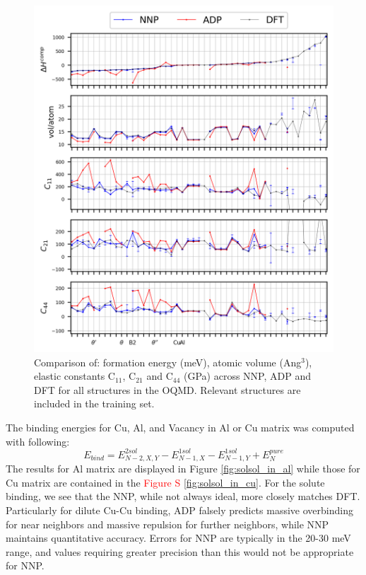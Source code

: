 \documentclass{article}
\begin{document}
\begin{figure}[H]%
\centering%
\includegraphics[width=1.2\textwidth,center]{figures/matparam_stats1.png}%
\caption{Comparison of: formation energy (meV), atomic volume (Ang$^3$), elastic constants C$_{11}$, C$_{21}$ and C$_{44}$ (GPa) across NNP, ADP and DFT for all structures in the OQMD. 
Relevant structures are included in the training set. }
\label{fig:matparam_stats1}
\end{figure}

The binding energies for Cu, Al, and Vacancy in Al or Cu matrix was computed with following:
\begin{equation}
E_{bind} = E^{2sol}_{N-2,X,Y}-E^{1sol}_{N-1,X}-E^{1sol}_{N-1,Y}+E^{pure}_N
\end{equation}
The results for Al matrix are displayed in Figure \ref{fig:solsol_in_al} while those for Cu matrix are contained in the \textcolor{red}{Figure S \ref{fig:solsol_in_cu}}.
For the solute binding, we see that the NNP, while not always ideal, more closely matches DFT.
Particularly for dilute Cu-Cu binding, ADP falsely predicts massive overbinding for near neighbors and massive repulsion for further neighbors, while NNP maintains quantitative accuracy.
Errors for NNP are typically in the 20-30 meV range, and values requiring greater precision than this would not be appropriate for NNP.
\end{document}
